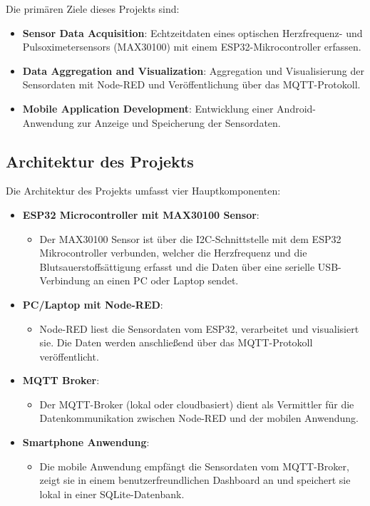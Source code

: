 \documentclass[conference,a4paper,flushend]{cs-techrep}
\begin{document}
Die primären Ziele dieses Projekts sind:
\begin{itemize}
    \item \textbf{Sensor Data Acquisition}: Echtzeitdaten eines optischen Herzfrequenz- und Pulsoximetersensors (MAX30100) mit einem ESP32-Mikrocontroller erfassen.
    \vspace{0.5em}
    \item \textbf{Data Aggregation and Visualization}: Aggregation und Visualisierung der Sensordaten mit Node-RED und Veröffentlichung über das MQTT-Protokoll.
    \vspace{0.5em}
    \item \textbf{Mobile Application Development}: Entwicklung einer Android-Anwendung zur Anzeige und Speicherung der Sensordaten.
\end{itemize}

\subsection{Architektur des Projekts}

Die Architektur des Projekts umfasst vier Hauptkomponenten:
\begin{itemize}
    \item \textbf{ESP32 Microcontroller mit MAX30100 Sensor}:
    \begin{itemize}
        \item Der MAX30100 Sensor ist über die I2C-Schnittstelle mit dem ESP32 Mikrocontroller verbunden, welcher die Herzfrequenz und die Blutsauerstoffsättigung erfasst und die Daten über eine serielle USB-Verbindung an einen PC oder Laptop sendet.
    \end{itemize}
    \item \textbf{PC/Laptop mit Node-RED}:
    \begin{itemize}
        \item Node-RED liest die Sensordaten vom ESP32, verarbeitet und visualisiert sie. Die Daten werden anschließend über das MQTT-Protokoll veröffentlicht.
    \end{itemize}
    \item \textbf{MQTT Broker}:
    \begin{itemize}
        \item Der MQTT-Broker (lokal oder cloudbasiert) dient als Vermittler für die Datenkommunikation zwischen Node-RED und der mobilen Anwendung.
    \end{itemize}
    \item \textbf{Smartphone Anwendung}:
    \begin{itemize}
        \item Die mobile Anwendung empfängt die Sensordaten vom MQTT-Broker, zeigt sie in einem benutzerfreundlichen Dashboard an und speichert sie lokal in einer SQLite-Datenbank.
    \end{itemize}
\end{itemize}
\end{document}
